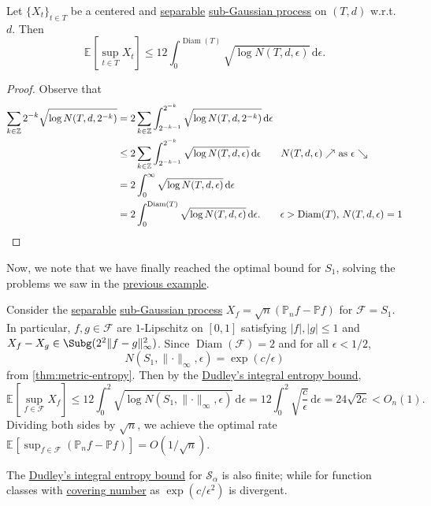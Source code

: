 \begin{corollary}\label{col:Dudley-integral-entropy-bound}
	Let \(\{ X_t \} _{t\in T}\) be a centered and \hyperref[def:separable]{separable} \hyperref[def:sub-Gaussian-process]{sub-Gaussian process} on \((T, d)\) w.r.t.\ \(d\). Then
	\[
		\mathbb{E}_{}\left[\sup _{t\in T} X_t \right] \leq 12 \int_{0}^{\mathop{\mathrm{Diam}}(T) }\sqrt{\log N(T, d, \epsilon )} \,\mathrm{d}\epsilon.
	\]
\end{corollary}
\begin{proof}
	Observe that
	\begin{align*}
		\sum_{k\in \mathbb{Z} } 2^{-k} \sqrt{\log N(T, d, 2^{-k})}
		 & = 2 \sum_{k\in \mathbb{Z} } \int_{2^{-k-1}}^{2^{-k}} \sqrt{\log N(T, d, 2^{-k})}  \,\mathrm{d} \epsilon                                                                        \\
		 & \leq 2 \sum_{k\in \mathbb{Z} } \int_{2^{-k-1}}^{2^{-k}} \sqrt{\log N(T, d, \epsilon )} \,\mathrm{d} \epsilon \tag*{\(N(T, d, \epsilon ) \nearrow \) as \(\epsilon \searrow \)} \\
		 & = 2 \int_{0}^{\infty} \sqrt{\log N(T, d, \epsilon )} \,\mathrm{d}\epsilon                                                                                                      \\
		 & = 2 \int_{0}^{\mathop{\mathrm{Diam}}(T) } \sqrt{\log N(T, d, \epsilon )} \,\mathrm{d}\epsilon. \tag*{\(\epsilon > \mathop{\mathrm{Diam}}(T) \), \(N(T, d, \epsilon ) = 1\)}
	\end{align*}
\end{proof}

Now, we note that we have finally reached the optimal bound for \(S_1\), solving the problems we saw in the \hyperref[eg:non-optimal-EP-supremum-S1]{previous example}.

\begin{eg}\label{eg:optimal-EP-supremum-S1}
	Consider the \hyperref[def:separable]{separable} \hyperref[def:sub-Gaussian-process]{sub-Gaussian process} \(X_f = \sqrt{n} (\mathbb{P} _n f - \mathbb{P} f)\) for \(\mathscr{F} = S_1\). In particular, \(f, g\in \mathscr{F} \) are \(1\)-Lipschitz on \([0, 1]\) satisfying \(\vert f \vert , \vert g \vert \leq 1\) and \(X_f - X_g\in \Subg(2^2 \lVert f - g \rVert ^2_\infty )\). Since \(\mathop{\mathrm{Diam}}(\mathscr{F} ) = 2 \) and for all \(\epsilon < 1 / 2\),
	\[
		N(S_1, \lVert \cdot \rVert _\infty , \epsilon ) = \exp (c / \epsilon )
	\]
	from \autoref{thm:metric-entropy}. Then by the \hyperref[col:Dudley-integral-entropy-bound]{Dudley's integral entropy bound},
	\[
		\mathbb{E}_{}\left[\sup _{f\in \mathscr{F} } X_f \right]
		\leq 12\int_{0}^{2} \sqrt{\log N(S_1, \lVert \cdot \rVert _\infty , \epsilon )} \,\mathrm{d}\epsilon
		= 12 \int_{0}^{2} \sqrt{\frac{c}{\epsilon }} \,\mathrm{d}\epsilon
		= 24 \sqrt{2c}
		< O_n(1).
	\]
	Dividing both sides by \(\sqrt{n} \), we achieve the optimal rate \(\mathbb{E}_{}\left[\sup _{f\in \mathscr{F} } (\mathbb{P} _n f - \mathbb{P} f) \right] = O(1 / \sqrt{n} )\).
\end{eg}

\begin{remark}
	The \hyperref[col:Dudley-integral-entropy-bound]{Dudley's integral entropy bound} for \(\mathcal{S} _\alpha \) is also finite; while for function classes with \hyperref[def:covering-number]{covering number} as \(\exp (c / \epsilon ^2)\) is divergent.
\end{remark}